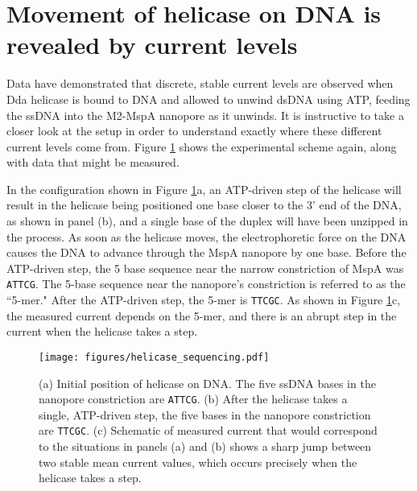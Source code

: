 \section{Movement of helicase on DNA is revealed by current levels}

Data have demonstrated that discrete, stable current levels are observed when Dda helicase is bound to DNA and allowed to unwind dsDNA using ATP, feeding the ssDNA into the M2-MspA nanopore as it unwinds.  It is instructive to take a closer look at the setup in order to understand exactly where these different current levels come from.  Figure \ref{fig:helicase_sequencing} shows the experimental scheme again, along with data that might be measured.

In the configuration shown in Figure \ref{fig:helicase_sequencing}a, an ATP-driven step of the helicase will result in the helicase being positioned one base closer to the 3’ end of the DNA, as shown in panel (b), and a single base of the duplex will have been unzipped in the process.  As soon as the helicase moves, the electrophoretic force on the DNA causes the DNA to advance through the MspA nanopore by one base.  Before the ATP-driven step, the 5 base sequence near the narrow constriction of MspA was \texttt{ATTCG}.  The 5-base sequence near the nanopore’s constriction is referred to as the ``5-mer."  After the ATP-driven step, the 5-mer is \texttt{TTCGC}.  As shown in Figure \ref{fig:helicase_sequencing}c, the measured current depends on the 5-mer, and there is an abrupt step in the current when the helicase takes a step.

\begin{figure}[h]
\begin{centering}
\texttt{[image: figures/helicase\_sequencing.pdf]}
\caption[Sequencing DNA with the help of a helicase]{(a) Initial position of helicase on DNA.  The five ssDNA bases in the nanopore constriction are \texttt{ATTCG}.  (b) After the helicase takes a single, ATP-driven step, the five bases in the nanopore constriction are \texttt{TTCGC}.  (c) Schematic of measured current that would correspond to the situations in panels (a) and (b) shows a sharp jump between two stable mean current values, which occurs precisely when the helicase takes a step.}
\label{fig:helicase_sequencing}
\end{centering}
\end{figure}

